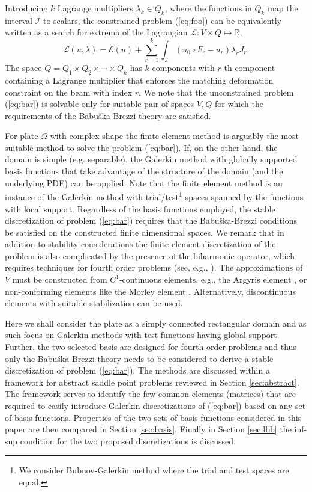 \documentclass{marine_2015}
\begin{document}
Introducing $k$ Lagrange multipliers $\lambda_k\in Q_k$, where the functions in 
$Q_k$ map the interval $\mathcal{I}$ to scalars, the constrained problem 
(\ref{eq:foo}) can be equivalently written as a search for extrema of the Lagrangian
$\mathcal{L}:V\times Q\mapsto \mathbb{R}$,
\begin{equation}
  \label{eq:bar}
\mathcal{L}\left(u, \lambda\right) = \mathcal{E}\left(u\right) +
  \sum_{r=1}^k\int_{\mathcal{I}}\left(u_0\circ F_r - u_r\right)\lambda_r J_r.
\end{equation}
The space $Q=Q_1\times Q_2\times\cdots\times Q_k$ has $k$ components with $r$-th
component containing a Lagrange multiplier that enforces the matching deformation 
constraint on the beam with index $r$. We note that the unconstrained problem (\ref{eq:bar}) 
is solvable only for suitable pair of spaces $V, Q$ for which the requirements of the
Babu\v{s}ka-Brezzi \cite{babuska, brezzi} theory are satisfied.

For plate $\Omega$ with complex shape the finite element method is arguably 
the most suitable method to solve the problem (\ref{eq:bar}). If, on the other hand, the
domain is simple (e.g. separable), the Galerkin method with globally supported basis functions
that take advantage of the structure of the domain (and the underlying PDE) can 
be applied. Note that the finite element method is an instance of the Galerkin 
method with trial/test\footnote{We consider Bubnov-Galerkin method where the
trial and test spaces are equal.} spaces spanned by the functions with local support. 
Regardless of the basis functions employed, the stable discretization of problem (\ref{eq:bar})
requires that the Babu\v{s}ka-Brezzi conditions be satisfied on the constructed
finite dimensional spaces. We remark that in addition to stability
considerations the finite element discretization of the problem is also complicated
by the presence of the biharmonic operator, which requires techniques for fourth order 
problems (see, e.g., \cite{brenner}). The approximations of $V$ must be constructed 
from $C^1$-continuous elements, e.g., the Argyris element \cite{argyris}, or non-conforming 
elements like the Morley element \cite{morley}. Alternatively, discontinuous elements with 
suitable stabilization \cite{brennerip} can be used. 

Here we shall consider the plate as a simply connected rectangular domain and as
such focus on Galerkin methods with test functions having global support.
Further, the two selected basis are designed for fourth order problems and thus 
only the Babu\v{s}ka-Brezzi theory needs to be considered to derive a stable
discretization of problem (\ref{eq:bar}). The methods are discussed within a
framework for abstract saddle point problems reviewed in Section
\ref{sec:abstract}. The framework serves to identify the few common
elements (matrices) that are required to easily introduce Galerkin discretizations of
(\ref{eq:bar}) based on any set of basis functions. Properties of the two sets of
basis functions considered in this paper are then compared in Section \ref{sec:basis}.
Finally in Section \ref{sec:lbb} the inf-sup condition for the two proposed
discretizations is discussed.
\end{document}
